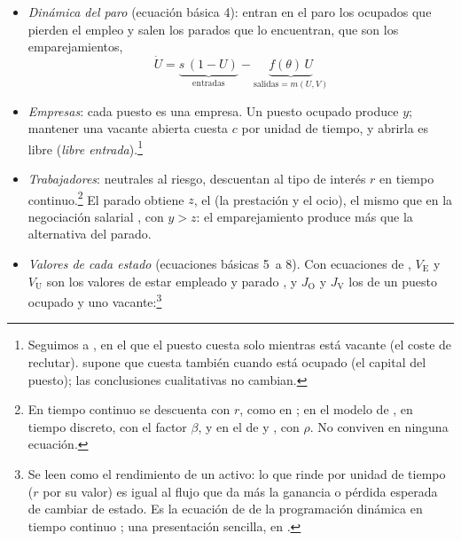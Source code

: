 \documentclass[11pt]{article}
\begin{document}
\begin{infografia}[H]
\centering
\caption{De la función de emparejamiento a los flujos: parados, ocupados y vacantes, sin inactivos}\label{figu:flujos-dmp}
\end{infografia}

\begin{itemize}
\item \emph{Dinámica del paro} (ecuación básica 4): entran en el paro los ocupados que pierden el empleo y salen los parados que lo encuentran, que son los emparejamientos,
  \begin{equation}
  \dot U=\underbrace{s\,(1-U)}_{\text{entradas}}-\underbrace{f(\theta)\,U}_{\text{salidas}=m(U,V)}\label{eq:dinamica-paro}
  \end{equation}
\item \emph{Empresas}: cada puesto es una empresa. Un puesto ocupado produce $y$; mantener una vacante abierta cuesta $c$ por unidad de tiempo, y abrirla es libre (\emph{libre entrada}).\footnote{Seguimos a \textcite[cap.~1]{Pissarides2000Equilibrium}, en el que el puesto cuesta solo mientras está vacante (el coste de reclutar). \textcite[cap.~11]{Romer2019Advanced} supone que cuesta también cuando está ocupado (el capital del puesto); las conclusiones cualitativas no cambian.}
\item \emph{Trabajadores}: neutrales al riesgo, descuentan al tipo de interés $r$ en tiempo continuo.\footnote{En tiempo continuo se descuenta con $r$, como en \textcite{Pissarides2000Equilibrium}; en el modelo de , en tiempo discreto, con el factor $\beta$, y en el de  y  , con $\rho$. No conviven en ninguna ecuación.} El parado obtiene $z$, el  (la prestación y el ocio), el mismo que en la negociación salarial , con $y>z$: el emparejamiento produce más que la alternativa del parado.
\item \emph{Valores de cada estado} (ecuaciones básicas 5~a 8). Con ecuaciones de , $V_{\mathrm E}$ y $V_{\mathrm U}$ son los valores de estar empleado y parado , y $J_{\mathrm O}$ y $J_{\mathrm V}$ los de un puesto ocupado y uno vacante:\footnote{Se leen como el rendimiento de un activo: lo que rinde por unidad de tiempo ($r$ por su valor) es igual al flujo que da más la ganancia o pérdida esperada de cambiar de estado. Es la ecuación de  de la programación dinámica en tiempo continuo ; una presentación sencilla, en \textcite{WikipediaBellman}.}

\end{itemize}
\end{document}
